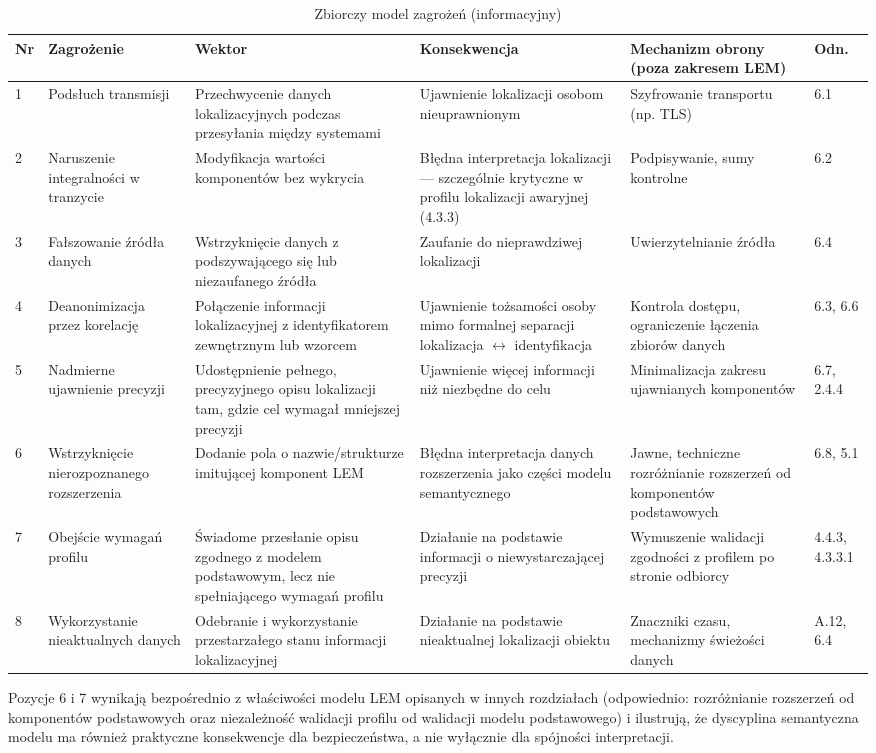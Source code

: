 \begin{table}[p]
\centering
\footnotesize
\setlength{\tabcolsep}{3pt}
\begin{tabular}{|p{0.35cm}|p{1.9cm}|p{2.3cm}|p{2.5cm}|p{2.5cm}|p{0.75cm}|}
\hline
\textbf{Nr} & \textbf{Zagrożenie} & \textbf{Wektor} & \textbf{Konsekwencja} & \textbf{Mechanizm obrony (poza zakresem LEM)} & \textbf{Odn.} \\ \hline
1 & Podsłuch transmisji & Przechwycenie danych lokalizacyjnych podczas przesyłania między systemami & Ujawnienie lokalizacji osobom nieuprawnionym & Szyfrowanie transportu (np. TLS) & 6.1 \\ \hline
2 & Naruszenie integralności w tranzycie & Modyfikacja wartości komponentów bez wykrycia & Błędna interpretacja lokalizacji — szczególnie krytyczne w profilu lokalizacji awaryjnej (4.3.3) & Podpisywanie, sumy kontrolne & 6.2 \\ \hline
3 & Fałszowanie źródła danych & Wstrzyknięcie danych z podszywającego się lub niezaufanego źródła & Zaufanie do nieprawdziwej lokalizacji & Uwierzytelnianie źródła & 6.4 \\ \hline
4 & Deanonimizacja przez korelację & Połączenie informacji lokalizacyjnej z identyfikatorem zewnętrznym lub wzorcem & Ujawnienie tożsamości osoby mimo formalnej separacji lokalizacja $\leftrightarrow$ identyfikacja & Kontrola dostępu, ograniczenie łączenia zbiorów danych & 6.3, 6.6 \\ \hline
5 & Nadmierne ujawnienie precyzji & Udostępnienie pełnego, precyzyjnego opisu lokalizacji tam, gdzie cel wymagał mniejszej precyzji & Ujawnienie więcej informacji niż niezbędne do celu & Minimalizacja zakresu ujawnianych komponentów & 6.7, 2.4.4 \\ \hline
6 & Wstrzyknięcie nierozpoznanego rozszerzenia & Dodanie pola o nazwie/strukturze imitującej komponent LEM & Błędna interpretacja danych rozszerzenia jako części modelu semantycznego & Jawne, techniczne rozróżnianie rozszerzeń od komponentów podstawowych & 6.8, 5.1 \\ \hline
7 & Obejście wymagań profilu & Świadome przesłanie opisu zgodnego z modelem podstawowym, lecz nie spełniającego wymagań profilu & Działanie na podstawie informacji o niewystarczającej precyzji & Wymuszenie walidacji zgodności z profilem po stronie odbiorcy & 4.4.3, 4.3.3.1 \\ \hline
8 & Wykorzystanie nieaktualnych danych & Odebranie i wykorzystanie przestarzałego stanu informacji lokalizacyjnej & Działanie na podstawie nieaktualnej lokalizacji obiektu & Znaczniki czasu, mechanizmy świeżości danych & A.12, 6.4 \\ \hline
\end{tabular}
\caption{Zbiorczy model zagrożeń (informacyjny)}
\label{tab:threat_model}
\end{table}

Pozycje 6 i 7 wynikają bezpośrednio z właściwości modelu LEM opisanych w innych rozdziałach (odpowiednio: rozróżnianie rozszerzeń od komponentów podstawowych oraz niezależność walidacji profilu od walidacji modelu podstawowego) i ilustrują, że dyscyplina semantyczna modelu ma również praktyczne konsekwencje dla bezpieczeństwa, a nie wyłącznie dla spójności interpretacji.
